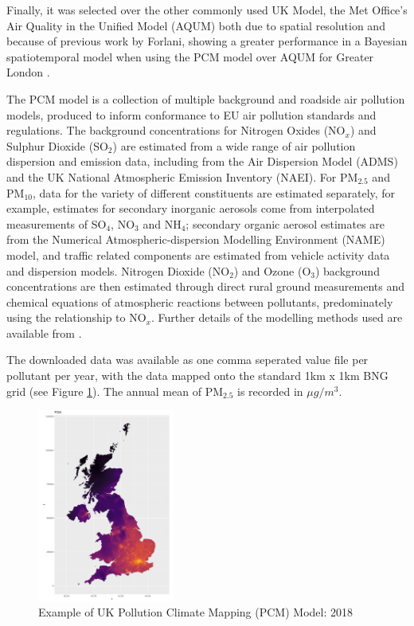 Finally, it was selected over the other commonly used UK Model, the Met Office's Air Quality in the Unified Model (AQUM) both due to spatial resolution and because of previous work by Forlani, showing a greater performance in a Bayesian spatiotemporal model when using the PCM model over AQUM for Greater London \cite{Forlani2020AR-INLA}.

The PCM model is a collection of multiple background and roadside air pollution models, produced to inform conformance to EU air pollution standards and regulations. The background concentrations for Nitrogen Oxides (NO$_x$) and Sulphur Dioxide (SO$_2$) are estimated from a wide range of air pollution dispersion and emission data, including from the Air Dispersion Model (ADMS) and the UK National Atmospheric Emission Inventory (NAEI). For PM$_2.5$ and PM$_10$, data for the variety of different constituents are estimated separately, for example, estimates for secondary inorganic aerosols come from interpolated measurements of SO$_4$, NO$_3$ and NH$_4$; secondary organic aerosol estimates are from the Numerical Atmospheric-dispersion Modelling Environment (NAME) model, and traffic related components are estimated from vehicle activity data and dispersion models. Nitrogen Dioxide (NO$_2$) and Ozone (O$_3$) background concentrations are then estimated through direct rural ground measurements and chemical equations of atmospheric reactions between pollutants, predominately using the relationship to NO$_x$. Further details of the modelling methods used are available from \cite{RicardoEnergyEnvironment2019Technical2019}. 

The downloaded data was available as one comma seperated value file per pollutant per year, with the data mapped onto the standard 1km x 1km BNG grid (see Figure \ref{fig:pcm}). The annual mean of PM$_{2.5}$ is recorded in $\mu g/m^3$.

\begin{figure}[h]
    \centering
    \includegraphics[width=0.4\textwidth]{Images/PCM.pdf}
    \caption{Example of UK Pollution Climate Mapping (PCM) Model: 2018}
    \label{fig:pcm}
\end{figure}

